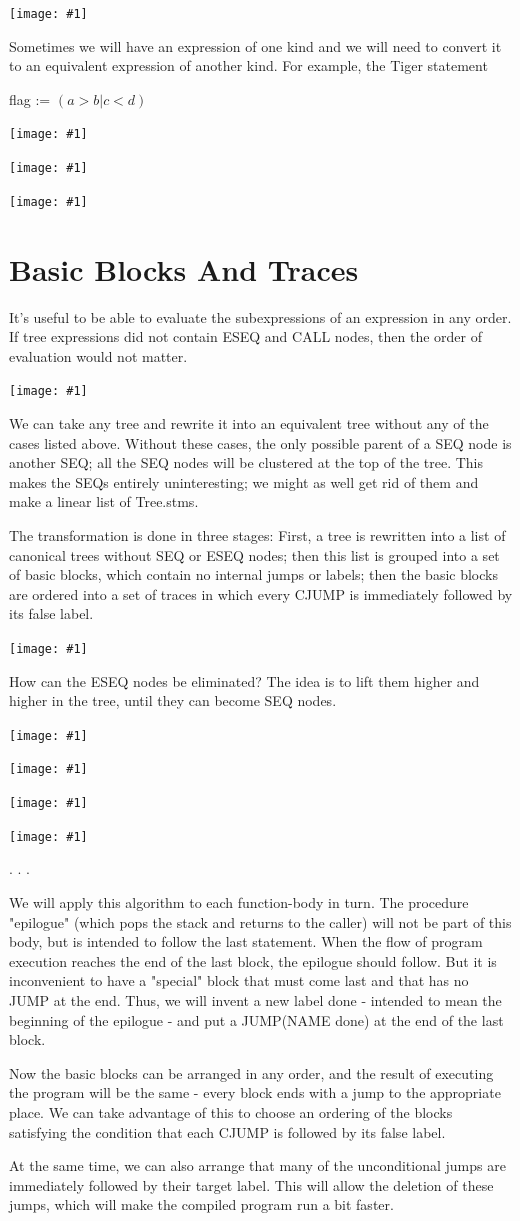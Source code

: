 \documentclass[8pt, a4paper, oneside, twocolumn]{extarticle}
\newcommand{\ph}[1]{
    \texttt{[image: \#1]}
}
\begin{document}
\ph{ir6}

Sometimes we will have an expression of one kind and we will need to
convert it to an equivalent expression of another kind. For example, the Tiger
statement

flag := $(a>b \vert c<d)$

\ph{ir7}

\ph{ir8}

\ph{ir9}

\section{Basic Blocks And Traces}
It's useful to be able to evaluate the subexpressions of an 
expression in any order. If tree expressions did not contain ESEQ and CALL nodes,
then the order of evaluation would not matter.

\ph{81}

We can take any tree and rewrite it into an equivalent tree without any of
the cases listed above. Without these cases, the only possible parent of a SEQ
node is another SEQ; all the SEQ nodes will be clustered at the top of the tree.
This makes the SEQs entirely uninteresting; we might as well get rid of them
and make a linear list of Tree.stms.

The transformation is done in three stages: First, a tree is rewritten into a
list of canonical trees without SEQ or ESEQ nodes; then this list is grouped
into a set of basic blocks, which contain no internal jumps or labels; then
the basic blocks are ordered into a set of traces in which every CJUMP is
immediately followed by its false label.

\ph{82}

How can the ESEQ nodes be eliminated? The idea is to lift them higher and
higher in the tree, until they can become SEQ nodes.

\ph{83}

\ph{84}

\ph{85}

\ph{86}

.
.
.

We will apply this algorithm to each function-body in turn. The procedure
"epilogue" (which pops the stack and returns to the caller) will not be part of
this body, but is intended to follow the last statement. When the flow of 
program execution reaches the end of the last block, the epilogue should follow.
But it is inconvenient to have a "special" block that must come last and that
has no JUMP at the end. Thus, we will invent a new label done - intended
to mean the beginning of the epilogue - and put a JUMP(NAME done) at the
end of the last block.

Now the basic blocks can be arranged in any order, and the result of executing
the program will be the same - every block ends with a jump to the 
appropriate place. We can take advantage of this to choose an ordering of the blocks
satisfying the condition that each CJUMP is followed by its false label.

At the same time, we can also arrange that many of the unconditional
jumps are immediately followed by their target label. This will allow the
deletion of these jumps, which will make the compiled program run a bit
faster.
\end{document}

